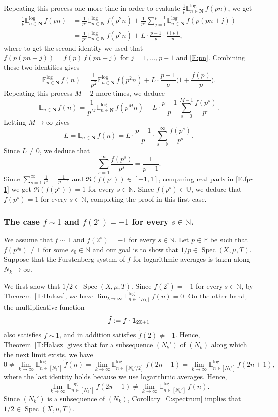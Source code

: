 \documentclass[11pt]{amsart}
\theoremstyle{definition}
\newcommand{\lE}{\mathbb{E}^{\log}}
\newcommand{\E}{{\mathbb E}}
\newcommand{\N}{{\mathbb N}}
\renewcommand{\P}{{\mathbb P}}
\newcommand{\Z}{{\mathbb Z}}
\newcommand{\U}{{\mathbb U}}
\newcommand{\bN}{{\mathbf{N}}}
\DeclareMathOperator{\spec}{Spec}
\begin{document}
Repeating this process one more time  in order to evaluate
$\frac{1}{p} \lE_{n\in \bN}\, f(pn)$, we get
\begin{align*}
\frac{1}{p} \lE_{n\in \bN}\, f(pn)&=
\frac{1}{p^2} \lE_{n\in \bN}\, f(p^2n)+\frac{1}{p^2}\sum_{j=1}^{p-1}\lE_{n\in \bN}\, f(p(pn+j))\\
&= \frac{1}{p^2} \lE_{n\in \bN}\, f(p^2n)+ L \cdot\frac{p-1}{p}\cdot  \frac{f(p)}{p},
\end{align*}
where to get the second  identity we used that $f(p(pn+j))=f(p)\, f(pn+j)$ for $j=1,\ldots, p-1$ and \eqref{E:pn}.
Combining these two identities gives
$$
\lE_{n\in \bN}\, f(n) =\frac{1}{p^2} \lE_{n\in \bN}\, f(p^2n)+L  \cdot \frac{p-1}{p} \Big(1+  \frac{f(p)}{p}\Big).
$$
Repeating this process $M-2$ more times, we deduce
$$
\E_{n\in \bN}\, f(n) = \frac{1}{p^M} \lE_{n\in \bN}\, f(p^Mn)+ L\cdot \frac{p-1}{p}\, \sum_{s=0}^{M-1} \frac{f(p^{s})}{p^s}.
$$
Letting $M\to\infty$ gives
$$
L=\E_{n\in \bN}\, f(n) =  L\cdot \frac{p-1}{p}\cdot \sum_{s=0}^\infty \frac{f(p^{s})}{p^s}.
$$
Since $L\neq 0$, we deduce that
\begin{equation}\label{E:fp-1}
\sum_{s=1}^\infty \frac{f(p^{s})}{p^{s}}  =\frac{1}{p-1}.
\end{equation}
Since $\sum_{s=1}^\infty \frac{1}{p^s}=\frac{1}{p-1}$ and $\Re(f(p^s))\in [-1,1]$,  comparing real parts in \eqref{E:fp-1} we get  $\Re(f(p^s))=1$ for every $s\in \N$.
Since $f(p^s)\in \U$, we deduce that $f(p^s)=1$ for every $s\in \N$, completing the proof in this first case.

\subsubsection{The case  $f\sim 1$ and $f(2^s)=-1$ for every $s\in\N$.}\label{SSS:spectrumreverse2}
We assume that $f\sim 1$ and $f(2^s)=-1$ for every $s\in\N$. Let $p\in \P$ be such that
$f(p^{s_0})\neq 1$ for some $s_0\in \N$ and our goal is to show that $1/p\in \spec(X,\mu,T)$. Suppose that the Furstenberg system of $f$ for logarithmic averages is taken along $N_k\to\infty$.


We first show that $1/2\in \spec(X,\mu,T)$. Since $f(2^s)=-1$ for every $s\in\N$, by Theorem~\ref{T:Halasz}, we have  $\lim_{k\to\infty} \lE_{n\in [N_k]}\, f(n)=0$. On the other hand,
the multiplicative function
\begin{equation}\label{E:xodd}
\tilde{f}:=f\cdot {\bf 1}_{2\Z+1}
\end{equation}
 also satisfies $\tilde{f}\sim 1$, and in addition satisfies $\tilde{f}(2)\neq -1$. Hence, Theorem~\ref{T:Halasz} gives that for a subsequence $(N_k')$ of $(N_k)$ along which the next limit exists, we have
$$
0\neq \lim_{k\to\infty} \lE_{n\in [N_k']}\, \tilde{f}(n)=\lim_{k\to\infty} \lE_{n\in [N_k'/2]}\, f(2n+1)=\lim_{k\to\infty} \lE_{n\in [N_k']}\, f(2n+1),
$$
where the last identity holds because we use logarithmic averages.
Hence,
$$
\lim_{k\to\infty} \lE_{n\in [N_k']}\, f(2n+1)\neq \lim_{k\to\infty} \lE_{n\in [N_k']}\, f(n).
$$
 Since $(N_k')$ is a subsequence of $(N_k)$,  Corollary~\ref{C:spectrum} implies that $1/2\in  \spec(X,\mu,T)$.
\end{document}
